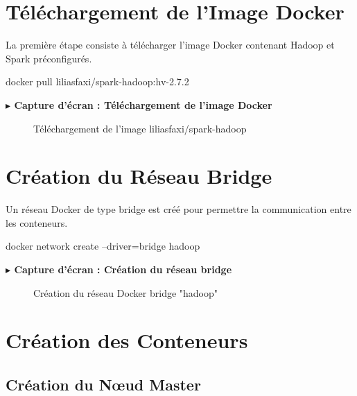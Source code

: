 \documentclass[12pt,a4paper]{report}
\newcommand{\etape}[1]{\vspace{6pt}\textbf{\color{bleuESP}$\blacktriangleright$ #1}\vspace{4pt}}
\begin{document}
\section{Téléchargement de l'Image Docker}

La première étape consiste à télécharger l'image Docker contenant Hadoop et Spark préconfigurés.

\begin{cmdbox}
docker pull liliasfaxi/spark-hadoop:hv-2.7.2
\end{cmdbox}

\etape{Capture d'écran : Téléchargement de l'image Docker}
\begin{figure}[H]
  \centering
  \caption{Téléchargement de l'image liliasfaxi/spark-hadoop}
\end{figure}

\section{Création du Réseau Bridge}

Un réseau Docker de type bridge est créé pour permettre la communication entre les conteneurs.

\begin{cmdbox}
docker network create --driver=bridge hadoop
\end{cmdbox}

\etape{Capture d'écran : Création du réseau bridge}
\begin{figure}[H]
  \centering
  \caption{Création du réseau Docker bridge "hadoop"}
\end{figure}

\section{Création des Conteneurs}

\subsection{Création du Nœud Master}
\end{document}
